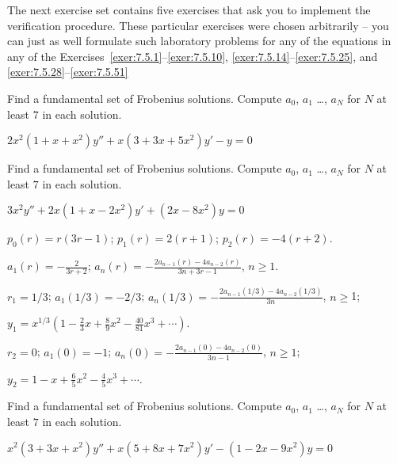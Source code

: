 \documentclass{ximera}
\begin{document}
The next exercise set contains five exercises that ask you to implement the verification
procedure. These particular exercises were chosen arbitrarily --   you can
just as well formulate such laboratory problems for any of the
equations in any  of the Exercises~\ref{exer:7.5.1}--\ref{exer:7.5.10},
\ref{exer:7.5.14}--\ref{exer:7.5.25}, and \ref{exer:7.5.28}--\ref{exer:7.5.51}


\begin{problem}\label{exer:7.5.1} 
Find a fundamental
set
of Frobenius solutions. Compute $a_0$, $a_{1}$ \dots, $a_N$ for $N$ at
least
$7$ in
each solution.

$2x^2(1+x+x^2)y''+x(3+3x+5x^2)y'-y=0$

\end{problem}

\begin{problem}\label{exer:7.5.2}
Find a fundamental
set
of Frobenius solutions. Compute $a_0$, $a_{1}$ \dots, $a_N$ for $N$ at
least
$7$ in
each solution.

$3x^2y''+2x(1+x-2x^2)y'+(2x-8x^2)y=0$

\begin{solution}
    $p_0(r)=r(3r-1)$;
$p_1(r)=2(r+1)$;
$p_2(r)=-4(r+2)$.

$a_1(r)=-\frac{2}{3r+2}$;
$a_n(r)=-\frac{2a_{n-1}(r)-4a_{n-2}(r)}{3n+3r-1}$,
$n\geq 1$.

$r_1=1/3$;
$a_1(1/3)=-2/3$;
$a_n(1/3)=-\frac{2a_{n-1}(1/3)-4a_{n-2}(1/3)}{3n}$,
$n\geq $1;

$y_1=x^{1/3}\left(1-\frac{2}{3}x+\frac{8}{9}x^2-
\frac{40}{81}x^3+\cdots\right)$.


$r_2=0$;
$a_1(0)=-1$;
$a_n(0)=-\frac{2a_{n-1}(0)-4a_{n-2}(0)}{3n-1}$,
$n\geq 1$;

$y_2=1-x+\frac{6}{5}x^2-\frac{4}{5}x^3+\cdots$.
\end{solution}

\end{problem}

\begin{problem}\label{exer:7.5.3}
Find a fundamental
set
of Frobenius solutions. Compute $a_0$, $a_{1}$ \dots, $a_N$ for $N$ at
least
$7$ in
each solution.

$x^2(3+3x+x^2)y''+x(5+8x+7x^2)y'-(1-2x-9x^2)y=0$

\end{problem}
\end{document}
